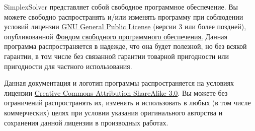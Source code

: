 \documentclass[pdftex, unicode, a4paper,12pt,oneside,utf8x, usehyperref]{report-gost}
\begin{document}
SimplexSolver представляет собой свободное программное обеспечение.
Вы можете свободно распространять и/или изменять программу при соблюдении условий лицензии \href{http://www.gnu.org/licenses/gpl.html}{GNU General Public License}
(версии 3 или более поздней), опубликованной
\href{http://www.fsf.org/}{Фондом свободного программного обеспечения.}
Данная программа распространяется в надежде, что она будет полезной,
но без всякой гарантии, в том числе без связанной гарантии товарной пригодности
или пригодности для частного использования.

Данная документация и логотип программы распространяется на условиях лицензии \href{http://www.creativecommons.org/licenses/by-sa/3.0/}{Creative Commons Attribution ShareAlike 3.0}.
Вы можете без ограничений распространять их, изменять и использовать в любых (в том числе коммерческих) целях при условии указания оригинального авторства и сохранения данной лицензии в производных работах.

\newpage





\end{document}
